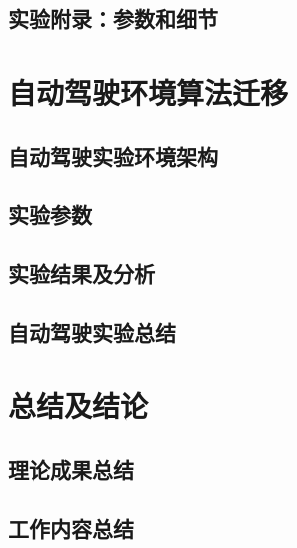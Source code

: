 \documentclass[degree=bachelor, tocarialchapter, pifootnote]{thuthesis}
\begin{document}
\section{实验附录：参数和细节}

\chapter{自动驾驶环境算法迁移}
\section{自动驾驶实验环境架构}
\section{实验参数}
\section{实验结果及分析}
\section{自动驾驶实验总结}

\chapter{总结及结论}
\section{理论成果总结}
\section{工作内容总结}

\backmatter

\listoffigures
\listoftables
\listofequations



% 





\begin{appendix}
%
%

\end{appendix}

%

%
\end{document}
